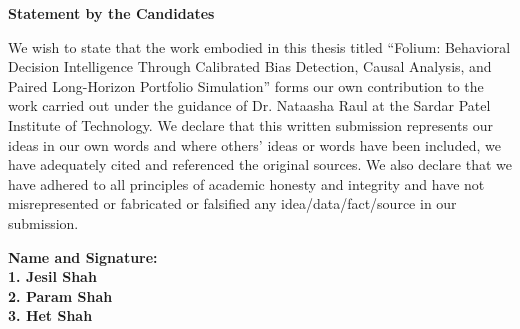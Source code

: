\thispagestyle{empty}
\vspace*{0.2cm}
\vspace{1cm}
\begin{center}
\large\textbf{Statement by the Candidates}
\end{center}
\vspace{2cm}
We wish to state that the work embodied in this thesis titled ``Folium: Behavioral Decision Intelligence Through Calibrated Bias Detection, Causal Analysis, and Paired Long-Horizon Portfolio Simulation'' forms our own contribution to the work carried out under the guidance of Dr. Nataasha Raul at the Sardar Patel Institute of Technology. We declare that this written submission represents our ideas in our own words and where others' ideas or words have been included, we have adequately cited and referenced the original sources. We also declare that we have adhered to all principles of academic honesty and integrity and have not misrepresented or fabricated or falsified any idea/data/fact/source in our submission.

\vspace{4cm}
\textbf{Name and Signature:}\\[0.8cm]
\textbf{1. Jesil Shah}\\[0.8cm]
\textbf{2. Param Shah}\\[0.8cm]
\textbf{3. Het Shah}
\newpage
